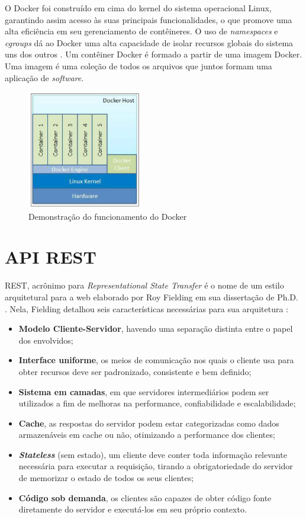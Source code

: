 O Docker foi construído em cima do kernel do sistema operacional Linux, garantindo assim acesso às suas principais funcionalidades, o que promove uma alta eficiência em seu gerenciamento de contêineres. O uso de \emph{namespaces} e \emph{cgroups} dá ao Docker uma alta capacidade de isolar recursos globais do sistema uns dos outros \cite{Raj2015-ju}. Um contêiner Docker é formado a partir de uma imagem Docker. Uma imagem é uma coleção de todos os arquivos que juntos formam uma aplicação de \emph{software}.

\begin{figure}
    \centering
    \includegraphics[width=0.45\textwidth]{img/Cap2/Docker Diagrama.png}
    \caption{Demonstração do funcionamento do Docker \cite{Raj2015-ju}}
    \label{fig:docker_diagrama}
\end{figure}

\section{API REST}
REST, acrônimo para \emph{Representational State Transfer} é o nome de um estilo arquitetural para a web elaborado por Roy Fielding em sua dissertação de Ph.D. \cite{Masse2011-cf}. Nela, Fielding detalhou seis características necessárias para sua arquitetura \cite{Grinberg2018-nz}:

\begin{itemize}
    \item \textbf{Modelo Cliente-Servidor}, havendo uma separação distinta entre o papel dos envolvidos;
    \item \textbf{Interface uniforme}, os meios de comunicação nos quais o cliente usa para obter recursos deve ser padronizado, consistente e bem definido;
    \item \textbf{Sistema em camadas}, em que servidores intermediários podem ser utilizados a fim de melhoras na performance, confiabilidade e escalabilidade;
    \item \textbf{Cache}, as respostas do servidor podem estar categorizadas como dados armazenáveis em cache ou não, otimizando a performance dos clientes;
    \item \textbf{\emph{Stateless}} (sem estado), um cliente deve conter toda informação relevante necessária para executar a requisição, tirando a obrigatoriedade do servidor de memorizar o estado de todos os seus clientes;
    \item \textbf{Código sob demanda}, os clientes são capazes de obter código fonte diretamente do servidor e executá-los em seu próprio contexto.
\end{itemize}

